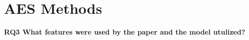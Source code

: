\documentclass{article}
\begin{document}
	
	
	\section{AES Methods}
	\textbf{RQ3 What features were used by the paper and the model utulized?}
	
\end{document}
